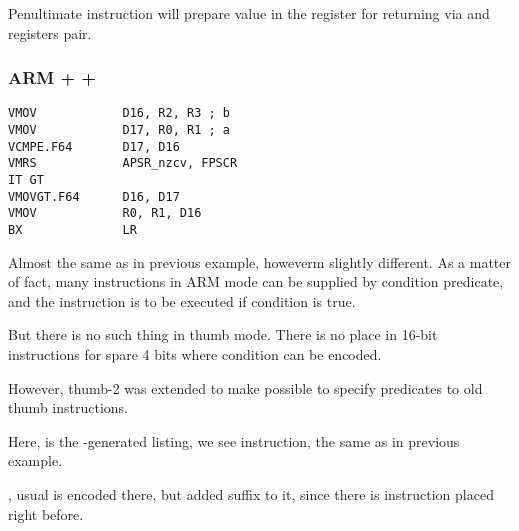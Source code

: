 {Penultimate instruction  will prepare value in the  register for returning via \Rzero and \Rone
registers pair.}

\subsubsection{ARM + \OptimizingXcode + \ThumbTwoMode}

\begin{lstlisting}[caption=\OptimizingXcode + \ThumbTwoMode]
VMOV            D16, R2, R3 ; b
VMOV            D17, R0, R1 ; a
VCMPE.F64       D17, D16
VMRS            APSR_nzcv, FPSCR
IT GT 
VMOVGT.F64      D16, D17
VMOV            R0, R1, D16
BX              LR
\end{lstlisting}

{Almost the same as in previous example, howeverm slightly different.}
{As a matter of fact, many instructions in ARM mode can be supplied by condition predicate,
and the instruction is to be executed if condition is true.}

{But there is no such thing in thumb mode}. 
{There is no place in 16-bit instructions for spare 4 bits where condition can be encoded.}

{However, thumb-2 was extended to make possible to specify predicates to old thumb instructions.}

{Here, is the \IDA-generated listing, we see  instruction, the same as in previous example.}

, 
{usual  is encoded there}, 
{but \IDA added  suffix to it}, 
{since there is  instruction placed right before}.

